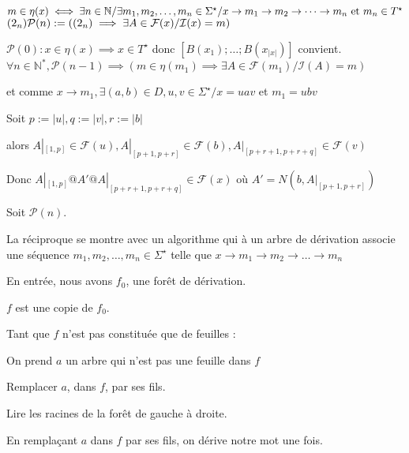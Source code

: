 \documentclass[a4paper,12pt]{article}
\newcommand{\norm}[1]{\lvert #1 \rvert}
\newlength{\mydepth}
\newlength{\myheight}
\newenvironment{answer}
{\par\begin{lrbox}{\mybox}\quad\begin{minipage}{\linewidth}\color{black}\setlength{\parskip}{10pt plus 1pt minus 1pt}\vspace*{-.7\baselineskip}}
{\end{minipage}\end{lrbox}
\settodepth{\mydepth}{\usebox{\mybox}}
\settoheight{\myheight}{\usebox{\mybox}}
\addtolength{\myheight}{\mydepth}
\noindent\makebox[0pt]{
  \color{gray}\hspace{-0pt}\rule[-\mydepth]{1pt}{\myheight}}
  \usebox{\mybox}
  }
\begin{document}
\begin{answer} 
$
m \in \eta(x)\\
\iff \exists n \in \mathbb{N} / \exists m_1,m_2,\dots,m_n \in \Sigma^\star / x \rightarrow m_1 \rightarrow m_2 \rightarrow \dots \rightarrow m_n\text{ et }m_n \in T^\star$    $ (2_n)\\
\mathcal{P}(n) := ((2_n) \implies \exists A \in \mathcal{F}(x) / \mathcal{I}(x) = m)$\\
\begin{answer} 
$\mathcal{P}(0) : x \in \eta(x) \implies x \in T^\star$ donc $[B (x_1);\dots;B (x_{\norm{x}})]$ convient.\\
$\forall n \in \mathbb{N}^*,\mathcal{P}(n-1) \implies (m \in \eta(m_1) \implies \exists A \in \mathcal{F}(m_1)/ \mathcal{I}(A) = m)$

 et comme $x\rightarrow m_1,\exists (a,b) \in D, u,v\in \Sigma^\star /x = uav$ et $m_1 = ubv$

 Soit $p := \norm{u}, q := \norm{v}, r := \norm{b}$
 
 alors $A|_{[1,p]} \in \mathcal{F}(u), A|_{[p+1,p+r]} \in \mathcal{F}(b), A|_{[p+r+1,p+r+q]} \in \mathcal{F}(v)$

 Donc $A|_{[1,p]}@A'@A|_{[p+r+1,p+r+q]}\in \mathcal{F}(x)$ où $A' = N (b,A|_{[p+1,p+r]})$

 Soit $\mathcal{P}(n)$.
\end{answer}
\end{answer}
La réciproque se montre avec un algorithme qui à un arbre de dérivation associe une séquence $m_1,m_2,\dots,m_n \in \Sigma^\star$ telle que $x \rightarrow m_1 \rightarrow m_2 \rightarrow \dots \rightarrow m_n$

En entrée, nous avons $f_0$, une forêt de dérivation.
\begin{answer} 
$f$ est une copie de $f_0$. 

Tant que $f$ n'est pas constituée que de feuilles :

\begin{answer} 
    On prend $a$ un arbre qui n'est pas une feuille dans $f$

    Remplacer $a$, dans $f$, par ses fils.

    Lire les racines de la forêt de gauche à droite.
\end{answer}
\end{answer}
En remplaçant $a$ dans $f$ par ses fils, on dérive notre mot une fois.\\\\
\end{document}
